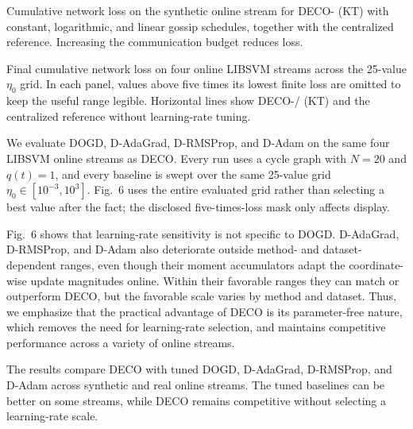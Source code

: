 \documentclass[12pt,english]{reviewresponse}
\newcommand{\algname}{{DECO}\xspace}
\begin{document}
\begin{revresponse}
\begin{changes}
        Cumulative network loss on the synthetic online stream for \algname{}- (KT) with constant, logarithmic, and linear gossip schedules, together with the centralized reference. Increasing the communication budget reduces loss.

        Final cumulative network loss on four online LIBSVM streams across the 25-value $\eta_0$ grid. In each panel, values above five times its lowest finite loss are omitted to keep the useful range legible. Horizontal lines show \algname{}-/ (KT) and the centralized reference without learning-rate tuning.

        We evaluate DOGD, D-AdaGrad, D-RMSProp, and D-Adam on the same four LIBSVM online streams as \algname{}.
        Every run uses a cycle graph with $N=20$ and $q(t)=1$, and every baseline is swept over the same 25-value grid $\eta_0\in[10^{-3},10^3]$.
        Fig.~6 uses the entire evaluated grid rather than selecting a best value after the fact; the disclosed five-times-loss mask only affects display.

        Fig.~6 shows that learning-rate sensitivity is not specific to DOGD\@.
        D-AdaGrad, D-RMSProp, and D-Adam also deteriorate outside method- and dataset-dependent ranges, even though their moment accumulators adapt the coordinate-wise update magnitudes online.
        Within their favorable ranges they can match or outperform \algname{}, but the favorable scale varies by method and dataset.
        Thus, we emphasize that the practical advantage of \algname{} is its parameter-free nature, which removes the need for learning-rate selection, and maintains competitive performance across a variety of online streams.

        The results compare \algname{} with tuned DOGD, D-AdaGrad, D-RMSProp, and D-Adam across synthetic and real online streams. The tuned baselines can be better on some streams, while \algname{} remains competitive without selecting a learning-rate scale.
    \end{changes}
\end{revresponse}
\end{document}
